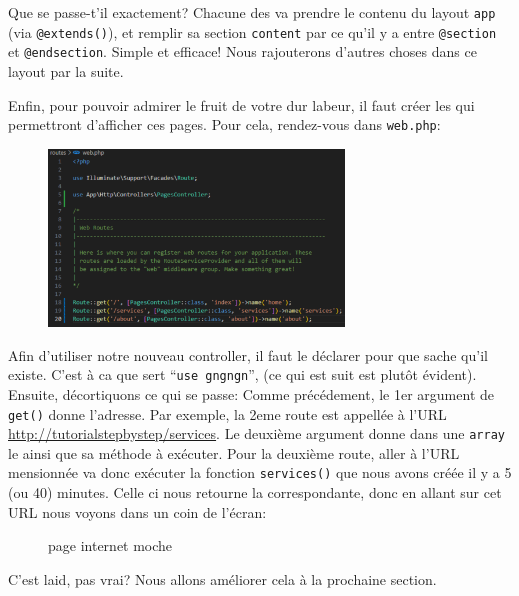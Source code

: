 Que se passe-t'il exactement? Chacune des \views{} va prendre le contenu du layout \verb|app| (via \verb|@extends()|), et remplir sa section \verb|content| par ce qu'il y a entre \verb|@section| et \verb|@endsection|. Simple et efficace! Nous rajouterons d'autres choses dans ce layout par la suite.

\newpage

Enfin, pour pouvoir admirer le fruit de votre dur labeur, il faut créer les \routes{} qui permettront d'afficher ces pages. Pour cela, rendez-vous dans \verb|web.php|:

\begin{figure}
    \vspace{-0.5cm}
    \includegraphics[width=0.7\textwidth]{figures-C1/3_premieres_routes.pdf}
\end{figure}
Afin d'utiliser notre nouveau controller, il faut le déclarer pour que \laravel{} sache qu'il existe. C'est à ca que sert ``\verb|use gngngn|'', (ce qui est suit est plutôt évident).
Ensuite, décortiquons ce qui se passe: Comme précédement, le 1er argument de \verb|get()| donne l'adresse. Par exemple, la 2eme route est appellée à l'URL \url{http://tutorialstepbystep/services}. Le deuxième argument donne dans une \texttt{array} le \controller{} ainsi que sa méthode à exécuter. Pour la deuxième route, aller à l'URL mensionnée va donc exécuter la fonction \verb|services()| que nous avons créée il y a 5 (ou 40) minutes. Celle ci nous retourne la \view{} correspondante, donc en allant sur cet URL nous voyons dans un coin de l'écran:

\begin{figure}[!h]
    \centering
    \caption{page internet moche}
\end{figure}

C'est laid, pas vrai? Nous allons améliorer cela à la prochaine section.

\newpage
